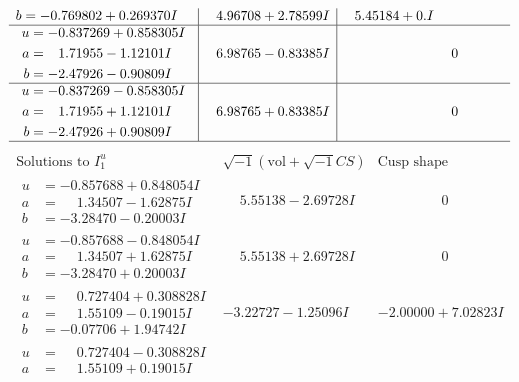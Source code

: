 \documentclass[1p]{elsarticle_modified}
\theoremstyle{definition}
\newcommand{\I}{\sqrt{-1}}
\begin{document}
$$\begin{array}{c|c|c}
\begin{aligned}
b &= -0.769802 + 0.269370 I\end{aligned}
 & \phantom{-}4.96708 + 2.78599 I & \phantom{-}5.45184 + 0. I\phantom{ +0.000000I} \\ \hline\begin{aligned}
u &= -0.837269 + 0.858305 I \\
a &= \phantom{-}1.71955 - 1.12101 I \\
b &= -2.47926 - 0.90809 I\end{aligned}
 & \phantom{-}6.98765 - 0.83385 I & \phantom{-0.000000 } 0 \\ \hline\begin{aligned}
u &= -0.837269 - 0.858305 I \\
a &= \phantom{-}1.71955 + 1.12101 I \\
b &= -2.47926 + 0.90809 I\end{aligned}
 & \phantom{-}6.98765 + 0.83385 I & \phantom{-0.000000 } 0\\
 \hline 
 \end{array}$$\newpage$$\begin{array}{c|c|c}  
\text{Solutions to }I^u_{1}& \I (\text{vol} + \sqrt{-1}CS) & \text{Cusp shape}\\
 \hline 
\begin{aligned}
u &= -0.857688 + 0.848054 I \\
a &= \phantom{-}1.34507 - 1.62875 I \\
b &= -3.28470 - 0.20003 I\end{aligned}
 & \phantom{-}5.55138 - 2.69728 I & \phantom{-0.000000 } 0 \\ \hline\begin{aligned}
u &= -0.857688 - 0.848054 I \\
a &= \phantom{-}1.34507 + 1.62875 I \\
b &= -3.28470 + 0.20003 I\end{aligned}
 & \phantom{-}5.55138 + 2.69728 I & \phantom{-0.000000 } 0 \\ \hline\begin{aligned}
u &= \phantom{-}0.727404 + 0.308828 I \\
a &= \phantom{-}1.55109 - 0.19015 I \\
b &= -0.07706 + 1.94742 I\end{aligned}
 & -3.22727 - 1.25096 I & -2.00000 + 7.02823 I \\ \hline\begin{aligned}
u &= \phantom{-}0.727404 - 0.308828 I \\
a &= \phantom{-}1.55109 + 0.19015 I \\

\end{aligned}
\end{array}$$
\end{document}
